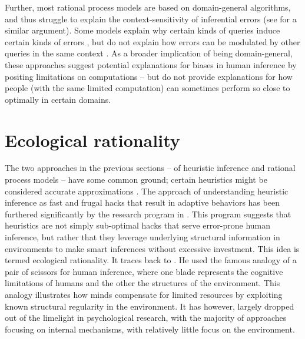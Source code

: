 Further, most rational process models are based on domain-general algorithms, and thus struggle to explain the context-sensitivity of inferential errors (see \citet{mercier2017enigma} for a similar argument). Some models explain why certain kinds of queries induce certain kinds of errors \citep{dasgupta2017hypotheses}, but do not explain how errors can be modulated by other queries in the same context \citep{gershman2014amortized,dasgupta2018remembrance}. As a broader implication of being domain-general, these approaches suggest potential explanations for biases in human inference by positing limitations on computations -- but do not provide explanations for how people (with the same limited computation) can sometimes perform so close to optimally in certain domains.

\section{Ecological rationality}

The two approaches in the previous sections -- of heuristic inference and rational process models -- have some common ground; certain heuristics might be considered accurate approximations \citep{gigerenzer2009homo, parpart2018heuristics, belousov2016catching}. The approach of understanding heuristic inference as fast and frugal hacks that result in adaptive behaviors has been furthered significantly by the research program in \citet{gigerenzer2011heuristic}. This program suggests that heuristics are not simply sub-optimal hacks that serve error-prone human inference, but rather that they leverage underlying structural information in environments to make smart inferences without excessive investment. This idea is termed ecological rationality. It traces back to \citet{simon1955behavioral}. He used the famous analogy of a pair of scissors for human inference, where one blade represents the cognitive limitations of humans and the other the structures of the environment. This analogy illustrates how minds compensate for limited resources by exploiting known structural regularity in the environment. It has however, largely dropped out of the limelight in psychological research, with the majority of approaches focusing on internal mechanisms, with relatively little focus on the environment.

